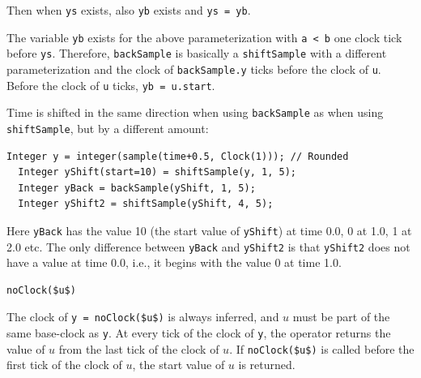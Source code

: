 \begin{operatordefinition}[backSample]
\begin{nonnormative}
Then when \lstinline!ys! exists, also \lstinline!yb! exists and \lstinline!ys = yb!.

The variable \lstinline!yb! exists for the above parameterization with \lstinline!a < b! one clock tick before \lstinline!ys!.
Therefore, \lstinline!backSample! is basically a \lstinline!shiftSample! with a different parameterization and the clock of \lstinline!backSample.y! ticks before the clock of \lstinline!u!.
Before the clock of \lstinline!u! ticks, \lstinline!yb = u.start!.
\begin{example}
Time is shifted in the same direction when using \lstinline!backSample! as when using \lstinline!shiftSample!, but by a different amount:
\begin{lstlisting}[language=modelica]
  Integer y = integer(sample(time+0.5, Clock(1))); // Rounded
  Integer yShift(start=10) = shiftSample(y, 1, 5);
  Integer yBack = backSample(yShift, 1, 5);
  Integer yShift2 = shiftSample(yShift, 4, 5);
\end{lstlisting}
Here \lstinline!yBack! has the value 10 (the start value of \lstinline!yShift!) at time 0.0, 0 at 1.0, 1 at 2.0 etc.
The only difference between \lstinline!yBack! and \lstinline!yShift2! is that \lstinline!yShift2! does not have a value at time 0.0, i.e., it begins with the value 0 at time 1.0.
\end{example}
\end{nonnormative}
\end{operatordefinition}

\begin{operatordefinition}[noClock]
\begin{synopsis}\begin{lstlisting}
noClock($u$)
\end{lstlisting}\end{synopsis}
\begin{semantics}
The clock of \lstinline!y = noClock($u$)! is always inferred, and $u$ must be part of the same base-clock as \lstinline!y!.
At every tick of the clock of \lstinline!y!, the operator returns the value of $u$ from the last tick of the clock of $u$.
If \lstinline!noClock($u$)! is called before the first tick of the clock of $u$, the start value of $u$ is returned.
\end{semantics}
\end{operatordefinition}

